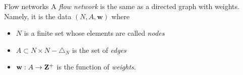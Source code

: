 %

\begin{frame}{Flow networks}
	A \emph{flow network} is the same as a directed graph with weights. Namely,
	it is the data $(N, A, \mathbf{w})$ where
	\begin{itemize}
		\item $N$ is a finite set whose elements are called \emph{nodes}
		\item $A \subset N \times N - \triangle_N$ is the set of \emph{edges}
		\item $\mathbf{w}: A \to \mathbf{Z}^+$ is the function of \emph{weights}.
	\end{itemize}
\end{frame}

%

